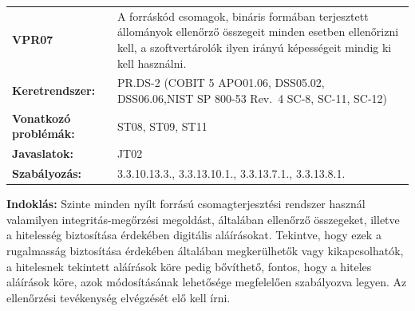 \documentclass[12pt,magyar,a4paper,oneside]{scrreprt}
\begin{document}
\begin{longtable}[]{@{}ll@{}}
\toprule
\endhead
\begin{minipage}[t]{0.16\columnwidth}\raggedright
\textbf{VPR07}\strut
\end{minipage} & \begin{minipage}[t]{0.79\columnwidth}\raggedright
A forráskód csomagok, bináris formában terjesztett állományok ellenőrző
összegeit minden esetben ellenőrizni kell, a szoftvertárolók ilyen
irányú képességeit mindig ki kell használni.\strut
\end{minipage}\tabularnewline
\begin{minipage}[t]{0.16\columnwidth}\raggedright
\textbf{Keretrendszer:}\strut
\end{minipage} & \begin{minipage}[t]{0.79\columnwidth}\raggedright
PR.DS-2 (COBIT 5 APO01.06, DSS05.02, DSS06.06,NIST SP 800-53 Rev.~4
SC-8, SC-11, SC-12)\strut
\end{minipage}\tabularnewline
\begin{minipage}[t]{0.16\columnwidth}\raggedright
\textbf{Vonatkozó problémák:}\strut
\end{minipage} & \begin{minipage}[t]{0.79\columnwidth}\raggedright
ST08, ST09, ST11\strut
\end{minipage}\tabularnewline
\begin{minipage}[t]{0.16\columnwidth}\raggedright
\textbf{Javaslatok:}\strut
\end{minipage} & \begin{minipage}[t]{0.79\columnwidth}\raggedright
JT02\strut
\end{minipage}\tabularnewline
\begin{minipage}[t]{0.16\columnwidth}\raggedright
\textbf{Szabályozás:}\strut
\end{minipage} & \begin{minipage}[t]{0.79\columnwidth}\raggedright
3.3.10.13.3., 3.3.13.10.1., 3.3.13.7.1., 3.3.13.8.1.\strut
\end{minipage}\tabularnewline
\bottomrule
\end{longtable}

\textbf{Indoklás: } Szinte minden nyílt forrású csomagterjesztési
rendszer használ valamilyen integritás-megőrzési megoldást, általában
ellenőrző összegeket, illetve a hitelesség biztosítása érdekében
digitális aláírásokat. Tekintve, hogy ezek a rugalmasság biztosítása
érdekében általában megkerülhetők vagy kikapcsolhatók, a hitelesnek
tekintett aláírások köre pedig bővíthető, fontos, hogy a hiteles
aláírások köre, azok módosításának lehetősége megfelelően szabályozva
legyen. Az ellenőrzési tevékenység elvégzését elő kell írni.
\end{document}
